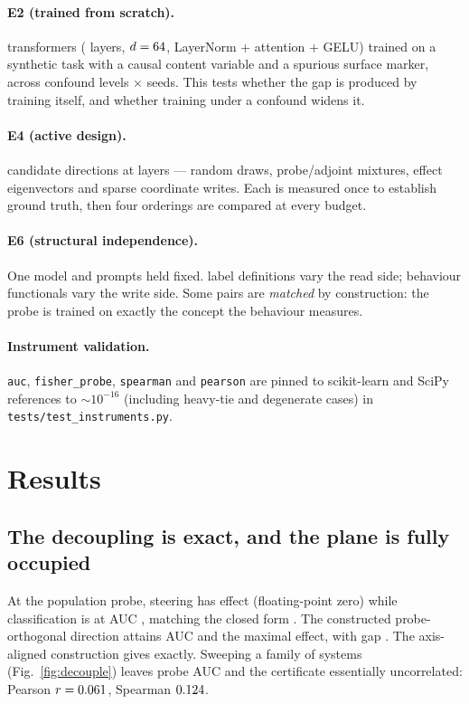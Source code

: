 \documentclass[11pt]{article}
\theoremstyle{definition}
\theoremstyle{remark}
\begin{document}
\paragraph{E2 (trained from scratch).} \EtwoNruns{} transformers
(\EtwoLayers{} layers, $d=64$, LayerNorm + attention + GELU) trained on a
synthetic task with a causal content variable and a spurious surface marker,
across \EtwoNlevels{} confound levels $\times$ \EtwoNseeds{} seeds. This tests
whether the gap is produced by training itself, and whether training under a
confound widens it.

\paragraph{E4 (active design).} \EfourM{} candidate directions at layers
\EfourLayers{} --- random draws, probe/adjoint mixtures, effect eigenvectors and
sparse coordinate writes. Each is measured once to establish ground truth, then
four orderings are compared at every budget.

\paragraph{E6 (structural independence).} One model and \EsixN{} prompts held
fixed. \EsixNlab{} label definitions vary the read side; \EsixNbeh{} behaviour
functionals vary the write side. Some pairs are \emph{matched} by construction:
the probe is trained on exactly the concept the behaviour measures.

\paragraph{Instrument validation.} \texttt{auc}, \texttt{fisher\_probe},
\texttt{spearman} and \texttt{pearson} are pinned to scikit-learn and SciPy
references to $\sim10^{-16}$ (including heavy-tie and degenerate cases) in
\texttt{tests/test\_instruments.py}.

\section{Results}
\label{sec:results}

\subsection{The decoupling is exact, and the plane is fully occupied}

At the population probe, steering has effect \EonePopEffect{} (floating-point
zero) while classification is at AUC \EoneProbeAUC{}, matching the closed form
\EoneProbeAUCclosed{}. The constructed probe-orthogonal direction attains AUC
\EoneDarkAUC{} and the maximal effect, with gap \EoneDarkGap{}. The
axis-aligned construction gives \EoneAxisPopEffect{} exactly. Sweeping a family
of systems (Fig.~\ref{fig:decouple}) leaves probe AUC and the certificate
essentially uncorrelated: Pearson $r=0.061$, Spearman $0.124$.
\end{document}
